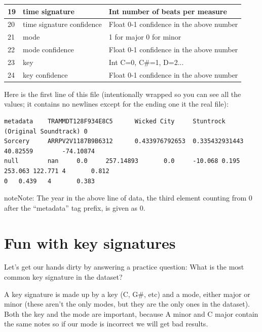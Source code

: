 \documentclass[letterpaper,10pt,openany,oneside]{sphinxmanual}
\begin{document}
\begin{tabulary}{\linewidth}{|L|L|L|}
19
 & 
time signature
 & 
Int number of beats per measure
\\\hline

20
 & 
time signature confidence
 & 
Float 0-1 confidence in the above number
\\\hline

21
 & 
mode
 & 
1 for major 0 for minor
\\\hline

22
 & 
mode confidence
 & 
Float 0-1 confidence in the above number
\\\hline

23
 & 
key
 & 
Int C=0, C\#=1, D=2...
\\\hline

24
 & 
key confidence
 & 
Float 0-1 confidence in the above number
\\\hline
\end{tabulary}


Here is the first line of this file (intentionally wrapped so you can see all the values;
it contains no newlines except for the ending one it the real file):

\begin{Verbatim}[commandchars=\\\{\}]
metadata    TRAMMDT128F934E8C5      Wicked City     Stuntrock (Original Soundtrack) 0
Sorcery     ARRPV2V1187B9B6312      0.433976792653  0.335432931443  40.82559        -74.10874
null        nan     0.0     257.14893       0.0     -10.068 0.195   253.063 122.771 4       0.812
0   0.439   4       0.383
\end{Verbatim}

\begin{notice}{note}{Note:}
The year in the above line of data, the third element counting from 0 after the ``metadata''
tag prefix, is given as 0.
\end{notice}


\chapter{Fun with key signatures}
\label{1-Keys/Keys:fun-with-key-signatures}\label{1-Keys/Keys::doc}
Let's get our hands dirty by answering a practice question:
What is the most common key signature in the dataset?

A key signature is made up by a key (C, G\#, etc) and a mode,
either major or minor (these aren't the only modes, but they are
the only ones in the dataset). Both the key and the mode are
important, because A minor and C major contain the same notes so
if our mode is incorrect we will get bad results.
\end{document}
